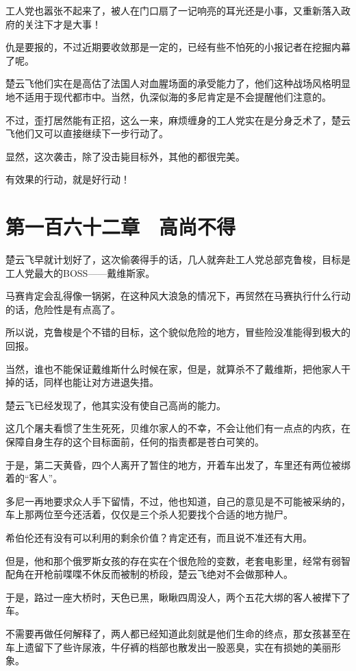 工人党也嚣张不起来了，被人在门口扇了一记响亮的耳光还是小事，又重新落入政府的关注下才是大事！

仇是要报的，不过近期要收敛那是一定的，已经有些不怕死的小报记者在挖掘内幕了呢。

楚云飞他们实在是高估了法国人对血腥场面的承受能力了，他们这种战场风格明显地不适用于现代都市中。当然，仇深似海的多尼肯定是不会提醒他们注意的。

不过，歪打居然能有正招，这么一来，麻烦缠身的工人党实在是分身乏术了，楚云飞他们又可以直接继续下一步行动了。

显然，这次袭击，除了没击毙目标外，其他的都很完美。

有效果的行动，就是好行动！

\section{第一百六十二章　高尚不得}

楚云飞早就计划好了，这次偷袭得手的话，几人就奔赴工人党总部克鲁梭，目标是工人党最大的BOSS——戴维斯家。

马赛肯定会乱得像一锅粥，在这种风大浪急的情况下，再贸然在马赛执行什么行动的话，危险性是有点高了。

所以说，克鲁梭是个不错的目标，这个貌似危险的地方，冒些险没准能得到极大的回报。

当然，谁也不能保证戴维斯什么时候在家，但是，就算杀不了戴维斯，把他家人干掉的话，同样也能让对方进退失措。

楚云飞已经发现了，他其实没有使自己高尚的能力。

这几个屠夫看惯了生生死死，贝维尔家人的不幸，不会让他们有一点点的内疚，在保障自身生存的这个目标面前，任何的指责都是苍白可笑的。

于是，第二天黄昏，四个人离开了暂住的地方，开着车出发了，车里还有两位被绑着的“客人”。

多尼一再地要求众人手下留情，不过，他也知道，自己的意见是不可能被采纳的，车上那两位至今还活着，仅仅是三个杀人犯要找个合适的地方抛尸。

希伯伦还有没有可以利用的剩余价值？肯定还有，而且说不准还有大用。

但是，他和那个俄罗斯女孩的存在实在个很危险的变数，老套电影里，经常有弱智配角在开枪前喋喋不休反而被制的桥段，楚云飞绝对不会做那种人。

于是，路过一座大桥时，天色已黑，瞅瞅四周没人，两个五花大绑的客人被撵下了车。

不需要再做任何解释了，两人都已经知道此刻就是他们生命的终点，那女孩甚至在车上遗留下了些许尿液，牛仔裤的档部也散发出一股恶臭，实在有损她的美丽形象。


